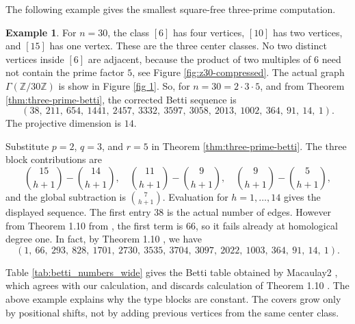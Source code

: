 \documentclass[12pt]{article}
\theoremstyle{definition}
\newtheorem{example}[theorem]{Example}
\begin{document}
\noindent The following example gives the smallest square-free three-prime computation.
\begin{example}\label{prop:z30}
	For $n=30$, the class $[6]$ has four vertices, $[10]$ has two vertices, and $[15]$ has one vertex.  These are the three center classes.  No two distinct vertices inside $[6]$ are adjacent, because the product of two multiples of $6$ need not contain the prime factor $5$, see Figure \ref{fig:z30-compressed}. The actual graph $\Gamma(\mathbb{Z}/30\mathbb{Z})$ is show in Figure \ref{fig 1}.
So, for $n=30=2\cdot 3\cdot 5$, and from Theorem \ref{thm:three-prime-betti}, the corrected Betti sequence is
$$
(38,\ 211,\ 654,\ 1441,\ 2457,\ 3332,\ 3597,\ 3058,\ 2013,\ 1002,\ 364,\ 91,\ 14,\ 1).
$$
The projective dimension is $14$.
\end{example}
 Substitute $p=2$, $q=3$, and $r=5$ in Theorem \ref{thm:three-prime-betti}.  The three block contributions are
$$
\binom{15}{h+1}-\binom{14}{h+1},\quad
\binom{11}{h+1}-\binom{9}{h+1},\quad
\binom{9}{h+1}-\binom{5}{h+1},
$$
and the global subtraction is $\binom{7}{h+1}$.  Evaluation for $h=1,\ldots,14$ gives the displayed sequence. 
 The first entry $38$ is the actual number of edges.  However from Theorem 1.10 from \cite{DungVu2026}, the first term is $66$, so it fails already at homological degree one. In fact, by Theorem 1.10 \cite{DungVu2026}, we have
 $$ (1,\ 66,\ 293,\ 828,\ 1701,\ 2730,\ 3535,\ 3704,\ 3097,\ 2022,\ 1003,\ 364,\ 91,\ 14,\ 1).$$


\begin{table}[htbp]
	\centering
	\ttfamily %
	\normalfont %
	\caption{Graded Betti numbers for the ideal of $\Gamma(\mathbb{Z}/30\mathbb{Z})$.}
	\label{tab:betti_numbers_wide}
\end{table}
Table \ref{tab:betti_numbers_wide} gives the Betti table obtained by Macaulay2 \cite{Macaulay2}, which agrees with our calculation, and discards calculation of Theorem 1.10 \cite{DungVu2026}.
\medskip
The above example explains why the type blocks are constant.  The covers grow only by positional shifts, not by adding previous vertices from the same center class.
\end{document}
